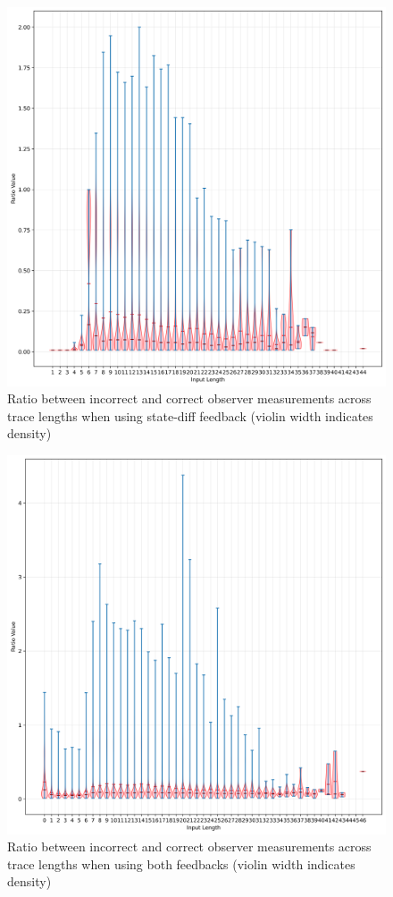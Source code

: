 \documentclass[twocolumn]{article}
\begin{document}
\begin{figure}
  \includegraphics[width=\columnwidth]{assets/consistency/state-diff-violin.png}
  \caption{Ratio between incorrect and correct observer measurements across trace lengths when using state-diff feedback (violin width indicates density)}
  \label{fig:state-diff-inter-violin}
\end{figure}
\begin{figure}
  \includegraphics[width=\columnwidth]{assets/consistency/both-violin.png}
  \caption{Ratio between incorrect and correct observer measurements across trace lengths when using both feedbacks (violin width indicates density)}
  \label{fig:both-inter-violin}
\end{figure}
\end{document}
